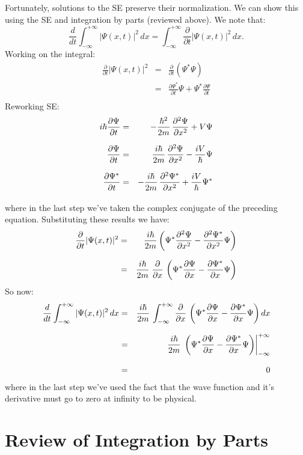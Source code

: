 \documentclass[12pt]{book}
\begin{document}
Fortunately, solutions to the SE preserve their normalization.  We can show this using the SE and integration by parts (reviewed above).  We note that:
$$\frac{d}{dt}\int_{-\infty}^{+\infty} |\Psi(x,t)|^2 \, dx  = 
\int_{-\infty}^{+\infty} \frac{\partial}{\partial t} |\Psi(x,t)|^2\, dx.$$ 
Working on the integral:
\begin{eqnarray*}
\frac{\partial}{\partial t} |\Psi(x,t)|^2 &=&  \frac{\partial}{\partial t} (\Psi^* \Psi) \\[7pt]
  &=&  \frac{\partial \Psi^*}{\partial t} \Psi + \Psi^* \frac{\partial \Psi}{\partial t} \\
\end{eqnarray*}
Reworking SE:
\begin{eqnarray*}
\label{eqn:se}
i \hbar  \frac{\partial \Psi}{\partial t}  &=& -  \frac{\hbar^2}{2 m}\, \frac{\partial^2 \Psi}{\partial x^2}  + V \Psi \\[7pt] 
        \frac{\partial \Psi}{\partial t}  &=& \;\; \frac{i \hbar}{2 m}\, \frac{\partial^2 \Psi}{\partial x^2}  - \frac{i V}{\hbar} \Psi \\[7pt]
        \frac{\partial \Psi^*}{\partial t}  &=& - \frac{i \hbar}{2 m}\, \frac{\partial^2 \Psi^*}{\partial x^2}  + \frac{i V}{\hbar} \Psi^* \\[7pt]
\end{eqnarray*}
where in the last step we've taken the complex conjugate of the preceding equation.  Substituting these results we have:
\begin{eqnarray}
\frac{\partial}{\partial t} |\Psi(x,t)|^2 &=&  \frac{i \hbar}{2 m} 
\left( \Psi^*  \frac{\partial^2 \Psi}{\partial x^2}  -  \frac{\partial^2 \Psi^*}{\partial x^2}  \Psi\right) \notag \\[7pt]
\label{eqn:dtpp}
  &=& \frac{i \hbar}{2 m} \;
\frac{\partial}{\partial x} \, \left( \Psi^*  \frac{\partial \Psi}{\partial x}  -  \frac{\partial \Psi^*}{\partial x}  \Psi\right)
\end{eqnarray}
So now:
\begin{eqnarray*}
\frac{d}{dt}\int_{-\infty}^{+\infty} |\Psi(x,t)|^2 \, dx  &=& 
\frac{i \hbar}{2 m} \, \int_{-\infty}^{+\infty}  \frac{\partial}{\partial x} \, \left( \Psi^*  \frac{\partial \Psi}{\partial x}  -  \frac{\partial \Psi^*}{\partial x}  \Psi\right) dx\\[7pt]
&=&  \frac{i \hbar}{2 m} \, \left. \left( \Psi^*  \frac{\partial \Psi}{\partial x}  -  \frac{\partial \Psi^*}{\partial x}  \Psi\right) 
\right\rvert_{-\infty}^{+\infty}\\[7pt]
&=& 0
\end{eqnarray*}
where in the last step we've used the fact that the wave function and it's derivative must go to zero at infinity to be physical.

\section{Review of Integration by Parts}
\end{document}
